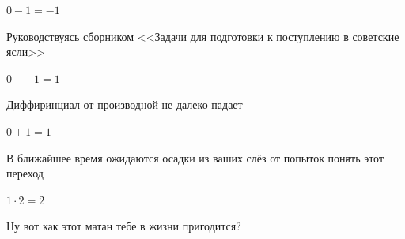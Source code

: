 \documentclass[12pt,a4paper,fleqn]{article}
\begin{document}
\begin{center}
\begin{center}
\begin{center}
\begin{center}
\begin{center}
\begin{center}
\begin{center}
\begin{center}
\begin{center}
\begin{center}
\begin{center}
\begin{center}
\begin{center}
\begin{center}
\begin{center}
\begin{center}
\begin{center}
\begin{center}
\begin{center}
\begin{center}
\begin{center}
\begin{center}
\begin{center}
\begin{center}
\begin{center}
\begin{center}
\begin{center}
\begin{center}
\begin{center}
\begin{center}
\begin{center}
\begin{center}
\begin{center}
\begin{center}
\begin{center}
\begin{center}
\begin{center}
\begin{center}
\begin{center}
\begin{center}
\begin{center}
\begin{center}
\begin{center}
\begin{center}
\begin{center}
\begin{center}
\begin{center}
\begin{center}
\begin{center}
\begin{center}
\begin{center}
\begin{center}
\begin{center}
\begin{center}
\begin{center}
\begin{center}
\begin{center}
\begin{center}
\begin{center}
\begin{center}
\begin{center}
\begin{center}
\begin{center}
\begin{center}
\begin{center}
\begin{center}
\begin{center}
\begin{center}
\begin{center}
\begin{center}
\begin{center}
\begin{center}
\begin{center}
\begin{center}
\begin{center}
\begin{center}
\begin{center}$0-1 = -1$\end{center}
Руководствуясь сборником <<Задачи для подготовки к поступлению в советские ясли>>\cite{link1}

\begin{center}
\begin{center}$0--1 = 1$\end{center}
Диффиринциал от производной не далеко падает\cite{link2}

\begin{center}
\begin{center}$0+1 = 1$\end{center}
В ближайшее время ожидаются осадки из ваших слёз от попыток понять этот переход

\begin{center}
\begin{center}$1 \cdot 2 = 2$\end{center}
Ну вот как этот матан тебе в жизни пригодится?


\end{center}
\end{center}
\end{center}
\end{center}
\end{center}
\end{center}
\end{center}
\end{center}
\end{center}
\end{center}
\end{center}
\end{center}
\end{center}
\end{center}
\end{center}
\end{center}
\end{center}
\end{center}
\end{center}
\end{center}
\end{center}
\end{center}
\end{center}
\end{center}
\end{center}
\end{center}
\end{center}
\end{center}
\end{center}
\end{center}
\end{center}
\end{center}
\end{center}
\end{center}
\end{center}
\end{center}
\end{center}
\end{center}
\end{center}
\end{center}
\end{center}
\end{center}
\end{center}
\end{center}
\end{center}
\end{center}
\end{center}
\end{center}
\end{center}
\end{center}
\end{center}
\end{center}
\end{center}
\end{center}
\end{center}
\end{center}
\end{center}
\end{center}
\end{center}
\end{center}
\end{center}
\end{center}
\end{center}
\end{center}
\end{center}
\end{center}
\end{center}
\end{center}
\end{center}
\end{center}
\end{center}
\end{center}
\end{center}
\end{center}
\end{center}
\end{center}
\end{center}
\end{center}
\end{center}
\end{document}
